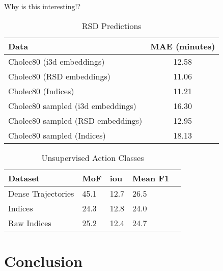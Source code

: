 \documentclass[10pt,twocolumn,letterpaper]{article}
\begin{document}
Why is this interesting!?
\begin{table}
  \centering
  \begin{tabular}{@{}lc@{}}
    \toprule
    Data & MAE (minutes) \\
    \midrule
    Cholec80 (i3d embeddings) & 12.58 \\
    Cholec80 (RSD embeddings) & 11.06 \\
    Cholec80 (Indices) & 11.21 \\
    \midrule
    Cholec80 sampled (i3d embeddings) & 16.30 \\
    Cholec80 sampled (RSD embeddings) & 12.95 \\
    Cholec80 sampled (Indices) & 18.13 \\
    \bottomrule
  \end{tabular}
  \caption{RSD Predictions}
  \label{tab:rsd_values}
\end{table}

\begin{table}
  \centering
  \begin{tabular}{lllll}
    \toprule
    Dataset & MoF & iou & Mean F1 \\
    \midrule
    Dense Trajectories & 45.1 & 12.7 & 26.5 \\
    Indices & 24.3 & 12.8 & 24.0 \\
    Raw Indices & 25.2 & 12.4 & 24.7 \\
    \midrule

    \bottomrule
  \end{tabular}
  \caption{Unsupervised Action Classes}
  \label{tab:unsup}
\end{table}

\section{Conclusion}
\label{sec:conclusion}

{\small


}
\end{document}
